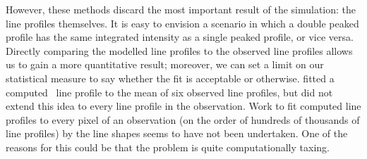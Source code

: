 However, these methods discard the most important result of the simulation: the line profiles themselves. It is easy to envision a scenario in which a double peaked profile has the same integrated intensity as a single peaked profile, or vice versa. Directly comparing the modelled line profiles to the observed line profiles allows us to gain a more quantitative result; moreover, we can set a limit on our statistical measure to say whether the fit is acceptable or otherwise. \cite{heinzel_understanding_2015} fitted a computed \mgii\ line profile to the mean of six observed line profiles, but did not extend this idea to every line profile in the observation. Work to fit computed line profiles to every pixel of an observation (on the order of hundreds of thousands of line profiles) by the line shapes seems to have not been undertaken. One of the reasons for this could be that the problem is quite computationally taxing. 

